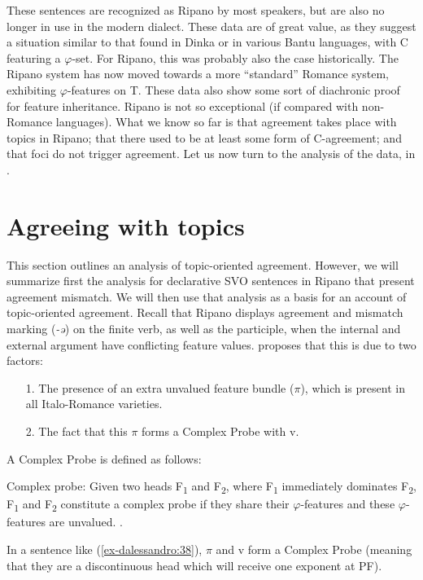 \documentclass[output=paper
,modfonts
,nonflat]{langsci/langscibook}
\begin{document}
\noindent These sentences are recognized as Ripano by most speakers, but are also no longer in use in the modern dialect. 
These data are of great value, as they suggest a situation similar to that found in Dinka or in various Bantu languages, with C featuring a $\varphi $-set. For Ripano, this was probably also the case historically. The Ripano system has now moved towards a more ``standard'' Romance system, exhibiting $\varphi $-features on T.
These data also show some sort of diachronic proof for feature inheritance. Ripano is not so exceptional (if compared with non-Romance languages).
What we know so far is that agreement takes place with topics in Ripano; that there used to be at least some form of C-agreement; and that foci do not trigger agreement.
Let us now turn to the analysis of the data, in .


\section{Agreeing with topics} \label{sec-dalessandro:5}
This section outlines an analysis of topic-oriented agreement. However, we will summarize first the analysis for declarative SVO sentences in Ripano that present agreement mismatch. We will then use that analysis as a basis for an account of topic-oriented agreement.
Recall that Ripano displays agreement and mismatch marking (\textit{-ə}) on the finite verb, as well as the participle, when the internal and external argument have conflicting feature values. \citet{D`Alessandro2017} proposes that this is due to two factors:

\begin{enumerate}
\item[1.]The presence of an extra unvalued feature bundle ($\pi $), which is present in all Italo-Romance varieties.
\item[2.]The fact that this $\pi $ forms a Complex Probe with v. 
\end{enumerate}
A Complex Probe is defined as follows:

\begin{exe}
\ex	Complex probe: Given two heads F\textsubscript{1} and F\textsubscript{2}, where F\textsubscript{1} immediately dominates F\textsubscript{2}, F\textsubscript{1} and F\textsubscript{2} constitute a complex probe if they share their $\varphi $-features and these $\varphi $-features are unvalued. \citep[24]{D`Alessandro2017}.
\end{exe}
In a sentence like (\ref{ex-dalessandro:38}), $\pi $ and v form a Complex Probe (meaning that they are a discontinuous head which will receive one exponent at PF). 
\end{document}
